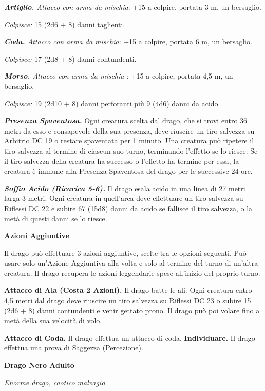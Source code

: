 \begin{multicols}{2}
\emph{\textbf{Artiglio.} Attacco con arma da mischia}: +15 a colpire,
portata 3 m, un bersaglio.

\emph{Colpisce:} 15 (2d6 + 8) danni taglienti.

\emph{\textbf{Coda.} Attacco con arma da mischia}: +15 a colpire,
portata 6 m, un bersaglio.

\emph{Colpisce:} 17 (2d8 + 8) danni contundenti.

\emph{\textbf{Morso.} Attacco con arma da mischia} : +15 a colpire,
portata 4,5 m, un bersaglio.

\emph{Colpisce:} 19 (2d10 + 8) danni perforanti più 9 (4d6) danni da
acido.

\emph{\textbf{Presenza Spaventosa.}} Ogni creatura scelta dal drago, che
si trovi entro 36 metri da esso e consapevole della sua presenza, deve
riuscire un tiro salvezza su Arbitrio DC 19 o restare spaventata per 1
minuto. Una creatura può ripetere il tiro salvezza al termine di ciascun
suo turno, terminando l'effetto se lo riesce. Se il tiro salvezza della
creatura ha successo o l'effetto ha termine per essa, la creatura è
immune alla Presenza Spaventosa del drago per le successive 24 ore.

\emph{\textbf{Soffio Acido (Ricarica 5-6).}} Il drago esala acido in una
linea di 27 metri larga 3 metri. Ogni creatura in quell'area deve
effettuare un tiro salvezza su Riflessi DC 22 e subire 67 (15d8) danni
da acido se fallisce il tiro salvezza, o la metà di questi danni se lo
riesce.

\textbf{Azioni Aggiuntive}

Il drago può effettuare 3 azioni aggiuntive, scelte tra le opzioni
seguenti. Può usare solo un'Azione Aggiuntiva alla volta e solo al
termine del turno di un'altra creatura. Il drago recupera le azioni
leggendarie spese all'inizio del proprio turno.

\textbf{Attacco di Ala (Costa 2 Azioni).} Il drago batte le ali. Ogni
creatura entro 4,5 metri dal drago deve riuscire un tiro salvezza su Riflessi DC 23 o subire 15 (2d6 + 8) danni contundenti e venir gettato
prono. Il drago può poi volare fino a metà della sua velocità di volo.

\textbf{Attacco di Coda.} Il drago effettua un attacco di coda.
\textbf{Individuare.} Il drago effettua una prova di Saggezza
(Percezione).



\textbf{Drago Nero Adulto}

\emph{Enorme drago, caotico malvagio}


\end{multicols}

